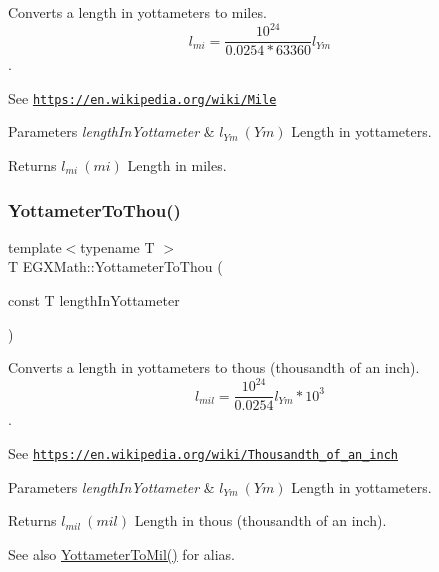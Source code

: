 Converts a length in yottameters to miles. \[ l_{mi}=\frac{10^{24}}{0.0254 * 63360} l_{Ym} \]. 

See \href{https://en.wikipedia.org/wiki/Mile}{\tt https\+://en.\+wikipedia.\+org/wiki/\+Mile} 
\begin{DoxyParams}{Parameters}
{\em length\+In\+Yottameter} & $ l_{Ym}\ (Ym)$ Length in yottameters. \\
\hline
\end{DoxyParams}
\begin{DoxyReturn}{Returns}
$ l_{mi}\ (mi)$ Length in miles. 
\end{DoxyReturn}
\mbox{\label{group___e_g_x_math-_conversions-_length_conversions-_yottameter-_imperial_ga9bf8eeca799b8246932d4aeaac425d87}} 
\subsubsection{\texorpdfstring{Yottameter\+To\+Thou()}{YottameterToThou()}}
{\footnotesize\ttfamily template$<$typename T $>$ \\
T E\+G\+X\+Math\+::\+Yottameter\+To\+Thou (\begin{DoxyParamCaption}\item[{const T}]{length\+In\+Yottameter }\end{DoxyParamCaption})}



Converts a length in yottameters to thous (thousandth of an inch). \[ l_{mil}= \frac{10^{24}}{0.0254} l_{Ym} * 10^{3} \]. 

See \href{https://en.wikipedia.org/wiki/Thousandth_of_an_inch}{\tt https\+://en.\+wikipedia.\+org/wiki/\+Thousandth\+\_\+of\+\_\+an\+\_\+inch} 
\begin{DoxyParams}{Parameters}
{\em length\+In\+Yottameter} & $ l_{Ym}\ (Ym)$ Length in yottameters. \\
\hline
\end{DoxyParams}
\begin{DoxyReturn}{Returns}
$ l_{mil}\ (mil)$ Length in thous (thousandth of an inch). 
\end{DoxyReturn}
\begin{DoxySeeAlso}{See also}
\mbox{\hyperlink{group___e_g_x_math-_conversions-_length_conversions-_yottameter-_imperial_ga71ee7b2256fffaec2663bd2eafc30a9d}{Yottameter\+To\+Mil()}} for alias. 
\end{DoxySeeAlso}
\mbox{\label{group___e_g_x_math-_conversions-_length_conversions-_yottameter-_imperial_ga87f19dee341e81a7bb72bf4a5134935f}} 
